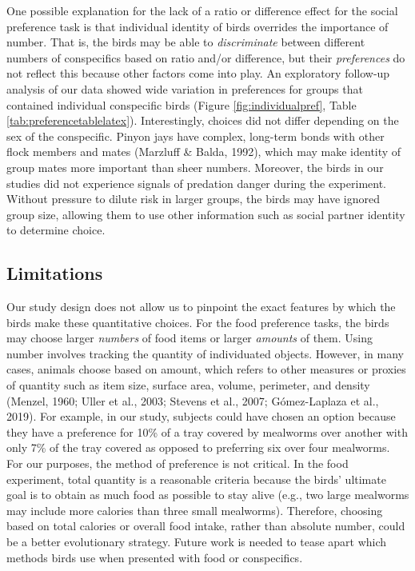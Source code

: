 \documentclass[
  ,pub,floatsintext]{apa6}
\begin{document}
One possible explanation for the lack of a ratio or difference effect for the social preference task is that individual identity of birds overrides the importance of number. That is, the birds may be able to \emph{discriminate} between different numbers of conspecifics based on ratio and/or difference, but their \emph{preferences} do not reflect this because other factors come into play. An exploratory follow-up analysis of our data showed wide variation in preferences for groups that contained individual conspecific birds (Figure \ref{fig:individualpref}, Table \ref{tab:preferencetablelatex}). Interestingly, choices did not differ depending on the sex of the conspecific. Pinyon jays have complex, long-term bonds with other flock members and mates (Marzluff \& Balda, 1992), which may make identity of group mates more important than sheer numbers. Moreover, the birds in our studies did not experience signals of predation danger during the experiment. Without pressure to dilute risk in larger groups, the birds may have ignored group size, allowing them to use other information such as social partner identity to determine choice.

\hypertarget{limitations}{%
\subsection{Limitations}\label{limitations}}

Our study design does not allow us to pinpoint the exact features by which the birds make these quantitative choices. For the food preference tasks, the birds may choose larger \emph{numbers} of food items or larger \emph{amounts} of them. Using number involves tracking the quantity of individuated objects. However, in many cases, animals choose based on amount, which refers to other measures or proxies of quantity such as item size, surface area, volume, perimeter, and density (Menzel, 1960; Uller et al., 2003; Stevens et al., 2007; Gómez-Laplaza et al., 2019). For example, in our study, subjects could have chosen an option because they have a preference for 10\% of a tray covered by mealworms over another with only 7\% of the tray covered as opposed to preferring six over four mealworms. For our purposes, the method of preference is not critical. In the food experiment, total quantity is a reasonable criteria because the birds' ultimate goal is to obtain as much food as possible to stay alive (e.g., two large mealworms may include more calories than three small mealworms). Therefore, choosing based on total calories or overall food intake, rather than absolute number, could be a better evolutionary strategy. Future work is needed to tease apart which methods birds use when presented with food or conspecifics.
\end{document}
